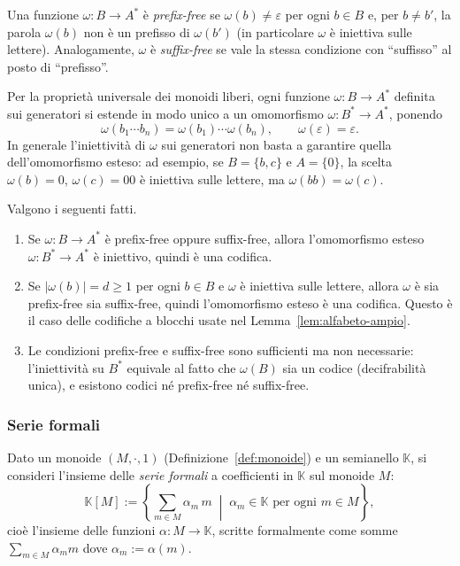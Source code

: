 \begin{defi}\label{def:prefix-suffix-free}
Una funzione $\omega\colon B\to A^*$ è \emph{prefix-free} se $\omega(b)\neq\varepsilon$
per ogni $b\in B$ e, per $b\neq b'$, la parola $\omega(b)$ non è un prefisso di
$\omega(b')$ (in particolare $\omega$ è iniettiva sulle lettere). Analogamente,
$\omega$ è \emph{suffix-free} se vale la stessa condizione con ``suffisso'' al posto di
``prefisso''.
\end{defi}

\begin{rema}\label{rem:estensione-omomorfismo}
Per la proprietà universale dei monoidi liberi, ogni funzione $\omega\colon B\to A^*$
definita sui generatori si estende in modo unico a un omomorfismo
$\omega\colon B^*\to A^*$, ponendo
\[
  \omega(b_1\cdots b_n)=\omega(b_1)\cdots\omega(b_n), \qquad \omega(\varepsilon)=\varepsilon.
\]
In generale l'iniettività di $\omega$ sui generatori non basta a garantire quella
dell'omomorfismo esteso: ad esempio, se $B=\{b,c\}$ e $A=\{0\}$, la scelta
$\omega(b)=0$, $\omega(c)=00$ è iniettiva sulle lettere, ma $\omega(bb)=\omega(c)$.
\end{rema}

\begin{rema}\label{rem:costruzione-codifiche}
Valgono i seguenti fatti.
\begin{enumerate}
  \item Se $\omega\colon B\to A^*$ è prefix-free oppure suffix-free, allora
  l'omomorfismo esteso $\omega\colon B^*\to A^*$ è iniettivo, quindi è una codifica.
  \item Se $|\omega(b)|=d\geq 1$ per ogni $b\in B$ e $\omega$ è iniettiva sulle
  lettere, allora $\omega$ è sia prefix-free sia suffix-free, quindi l'omomorfismo
  esteso è una codifica. Questo è il caso delle codifiche a blocchi usate nel
  Lemma~\ref{lem:alfabeto-ampio}.
  \item Le condizioni prefix-free e suffix-free sono sufficienti ma non necessarie:
  l'iniettività su $B^*$ equivale al fatto che $\omega(B)$ sia un codice
  (decifrabilità unica), e esistono codici né prefix-free né suffix-free.
\end{enumerate}
\end{rema}
\subsubsection{Serie formali}

\begin{defi}\label{def:serie-formali}
Dato un monoide $(M,\cdot,1)$ (Definizione~\ref{def:monoide}) e un semianello $\mathbb{K}$, si consideri l'insieme delle \emph{serie formali} a coefficienti in $\mathbb{K}$ sul monoide $M$:
\[\mathbb{K}[M] := \left\{ \sum_{m\in M} \alpha_m\, m \;\middle\vert{}\; \alpha_m\in\mathbb{K} \text{ per ogni } m\in M \right\},\]
cioè l'insieme delle funzioni $\alpha: M \to \mathbb{K}$, scritte formalmente come somme $\sum_{m\in M}\alpha_m m$ dove $\alpha_m:=\alpha(m)$.
\end{defi}

